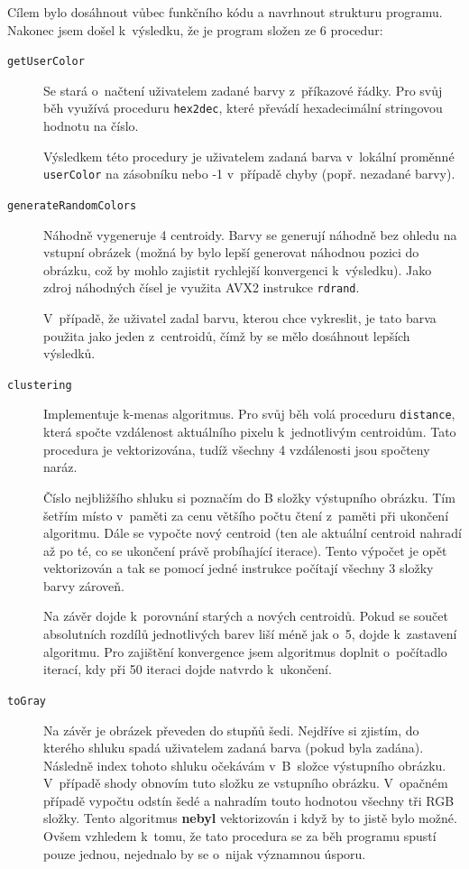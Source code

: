 \documentclass[11pt,a4paper,onecolumn,notitlepage]{article}
\begin{document}
		Cílem bylo dosáhnout vůbec funkčního kódu a navrhnout strukturu programu. Nakonec jsem došel k~výsledku, že je program složen ze 6 procedur:
		\begin{description}
			\item[\texttt{getUserColor}] Se stará o~načtení uživatelem zadané barvy z~příkazové řádky. Pro svůj běh využívá proceduru \texttt{hex2dec}, které převádí hexadecimální stringovou hodnotu na číslo.
			
			Výsledkem této procedury je uživatelem zadaná barva v~lokální proměnné \texttt{userColor} na zásobníku nebo -1 v~případě chyby (popř. nezadané barvy).
			
			
			\item[\texttt{generateRandomColors}] Náhodně vygeneruje 4 centroidy. Barvy se generují náhodně bez ohledu na vstupní obrázek (možná by bylo lepší generovat náhodnou pozici do obrázku, což by mohlo zajistit rychlejší konvergenci k~výsledku). Jako zdroj náhodných čísel je využita AVX2 instrukce \texttt{rdrand}.
			
			V~případě, že uživatel zadal barvu, kterou chce vykreslit, je tato barva použita jako jeden z~centroidů, čímž by se mělo dosáhnout lepších výsledků.
			
			
			\item[\texttt{clustering}] Implementuje k-menas algoritmus. Pro svůj běh volá proceduru \texttt{distance}, která spočte vzdálenost aktuálního pixelu k~jednotlivým centroidům. Tato procedura je vektorizována, tudíž všechny 4 vzdálenosti jsou spočteny naráz.
			
			Číslo nejbližšího shluku si poznačím do B složky výstupního obrázku. Tím šetřím místo v~paměti za cenu většího počtu čtení z~paměti při ukončení algoritmu. Dále se vypočte nový centroid (ten ale aktuální centroid nahradí až po té, co se ukončení právě probíhající iterace). Tento výpočet je opět vektorizován a tak se pomocí jedné instrukce počítají všechny 3 složky barvy zároveň.

			Na závěr dojde k~porovnání starých a nových centroidů. Pokud se součet absolutních rozdílů jednotlivých barev liší méně jak o~5, dojde k~zastavení algoritmu. Pro zajištění konvergence jsem algoritmus doplnit o~počítadlo iterací, kdy při 50 iteraci dojde natvrdo k~ukončení. 
			
			
			\item[\texttt{toGray}] Na závěr je obrázek převeden do stupňů šedi. Nejdříve si zjistím, do kterého shluku spadá uživatelem zadaná barva (pokud byla zadána). Následně index tohoto shluku očekávám v~B~složce výstupního obrázku. V~případě shody obnovím tuto složku ze vstupního obrázku. V~opačném případě vypočtu odstín šedé a nahradím touto hodnotou všechny tři RGB složky. Tento algoritmus \textbf{nebyl} vektorizován i když by to jistě bylo možné. Ovšem vzhledem k~tomu, že tato procedura se za běh programu spustí pouze jednou, nejednalo by se o~nijak významnou úsporu.
		\end{description}
	
\end{document}

